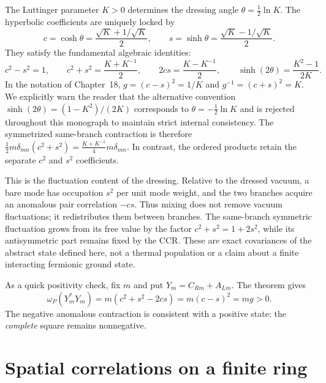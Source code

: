 The Luttinger parameter $K > 0$ determines the dressing angle $\theta = \frac{1}{2}\ln K$.
The hyperbolic coefficients are uniquely locked by
\begin{equation}
 c = \cosh\theta = \frac{\sqrt{K} + 1/\sqrt{K}}{2}, \qquad
 s = \sinh\theta = \frac{\sqrt{K} - 1/\sqrt{K}}{2}.
 \label{eq:ch19-hyperbolic-locked}
\end{equation}
They satisfy the fundamental algebraic identities:
\begin{equation}
 c^2 - s^2 = 1, \qquad
 c^2 + s^2 = \frac{K + K^{-1}}{2}, \qquad
 2cs = \frac{K - K^{-1}}{2}, \qquad
 \sinh(2\theta) = \frac{K^2 - 1}{2K}.
 \label{eq:ch19-mode-g-coefficients}
\end{equation}
In the notation of Chapter~18, $g = (c-s)^2 = 1/K$ and $g^{-1} = (c+s)^2 = K$.
We explicitly warn the reader that the alternative convention $\sinh(2\theta) = (1-K^2)/(2K)$
corresponds to $\theta = -\frac{1}{2}\ln K$ and is rejected throughout this monograph to maintain
strict internal consistency.
The symmetrized same-branch contraction is therefore
$\tfrac12m\delta_{mn}(c^2+s^2) = \frac{K+K^{-1}}{4}m\delta_{mn}$.  In contrast, the ordered
products retain the separate $c^2$ and $s^2$ coefficients.

This is the fluctuation content of the dressing.  Relative to the
dressed vacuum, a bare mode has occupation $s^2$ per unit mode weight,
and the two branches acquire an anomalous pair correlation $-cs$.
Thus mixing does not remove vacuum fluctuations; it redistributes
them between branches.  The same-branch symmetric fluctuation grows
from its free value by the factor $c^2+s^2=1+2s^2$, while its
antisymmetric part remains fixed by the CCR.  These are exact
covariances of the abstract state defined here, not a thermal
population or a claim about a finite interacting fermionic ground state.

As a quick positivity check, fix $m$ and put
$Y_m=C_{Rm}+A_{Lm}$.  The theorem gives
\begin{equation}
 \omega_P(Y_m^*Y_m)
   =m(c^2+s^2-2cs)=m(c-s)^2=mg>0.
 \label{eq:ch19-squeezed-check}
\end{equation}
The negative anomalous contraction is consistent with a positive
state: the \emph{complete} square remains nonnegative.

\section{Spatial correlations on a finite ring}
\label{sec:ch19-spatial-correlators}


